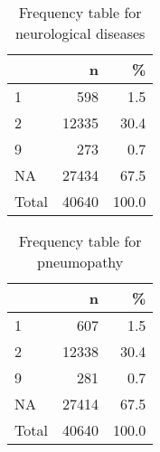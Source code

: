 \documentclass[
]{article}
\newenvironment{Shaded}{\begin{snugshade}}{\end{snugshade}}
\newcommand{\DataTypeTok}[1]{\textcolor[rgb]{0.13,0.29,0.53}{#1}}
\newcommand{\DecValTok}[1]{\textcolor[rgb]{0.00,0.00,0.81}{#1}}
\newcommand{\KeywordTok}[1]{\textcolor[rgb]{0.13,0.29,0.53}{\textbf{#1}}}
\newcommand{\NormalTok}[1]{#1}
\newcommand{\OperatorTok}[1]{\textcolor[rgb]{0.81,0.36,0.00}{\textbf{#1}}}
\newcommand{\OtherTok}[1]{\textcolor[rgb]{0.56,0.35,0.01}{#1}}
\newcommand{\StringTok}[1]{\textcolor[rgb]{0.31,0.60,0.02}{#1}}
\begin{document}
\begin{table}[!h]

\caption{\label{tab:unnamed-chunk-28}Frequency table for neurological diseases}
\centering
\begin{tabular}[t]{l|r|r}
\hline
  & n & \%\\
\hline
1 & 598 & 1.5\\
\hline
2 & 12335 & 30.4\\
\hline
9 & 273 & 0.7\\
\hline
NA & 27434 & 67.5\\
\hline
Total & 40640 & 100.0\\
\hline
\end{tabular}
\end{table}

\begin{Shaded}
\end{Shaded}

\begin{table}[!h]

\caption{\label{tab:unnamed-chunk-29}Frequency table for pneumopathy}
\centering
\begin{tabular}[t]{l|r|r}
\hline
  & n & \%\\
\hline
1 & 607 & 1.5\\
\hline
2 & 12338 & 30.4\\
\hline
9 & 281 & 0.7\\
\hline
NA & 27414 & 67.5\\
\hline
Total & 40640 & 100.0\\
\hline
\end{tabular}
\end{table}
\end{document}
